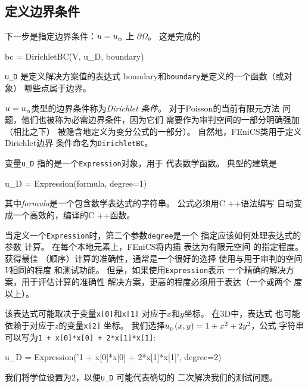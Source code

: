 \subsection{定义边界条件}
下一步是指定边界条件：$u=\ub$ 上
$\partial\Omega$。 这是完成的

\begin{python}
bc = DirichletBC(V, u_D, boundary)
\end{python}

\verb!u_D! 是定义解决方案值的表达式
boundary和\texttt{boundary}是定义的一个函数（或对象）
哪些点属于边界。

$u=\ub$类型的边界条件称为\emph{Dirichlet
条件}。 对于Poisson的当前有限元方法
问题，他们也被称为必需边界条件，因为它们
需要作为审判空间的一部分明确强加（相比之下）
被隐含地定义为变分公式的一部分）。
自然地，FEniCS类用于定义Dirichlet边界
条件命名为\texttt{DirichletBC}。


变量\verb!u_D! 指的是一个\texttt{Expression}对象，用于
代表数学函数。 典型的建筑是

\begin{python}
u_D = Expression(formula, degree=1)
\end{python}

其中\emph{formula}是一个包含数学表达式的字符串。
公式必须用C ++语法编写
自动变成一个高效的，编译的C ++函数。

\begin{notice}[表达和准确性]
当定义一个\texttt{Expression}时，第二个参数\texttt{degree}是一个
指定应该如何处理表达式的参数
计算。 在每个本地元素上，FEniCS将内插
表达为有限元空间
的指定程度。 获得最佳
（顺序）计算的准确性，通常是一个很好的选择
使用与用于审判的空间$ V $相同的程度
和测试功能。 但是，如果使用\texttt{Expression}表示
一个精确的解决方案，用于评估计算的准确性
解决方案，更高的程度必须用于表达（一个或两个
度以上）。
\end{notice}

该表达式可能取决于变量\texttt{x[0]}和\texttt{x[1]}
对应于$x$和$y$坐标。 在3D中，表达式
也可能依赖于对应于$z$的变量\texttt{x[2]}
坐标。 我们选择$\ub(x,y)=1 + x^2 + 2y^2$，公式
字符串可以写为\texttt{1 + x[0]*x[0] + 2*x[1]*x[1]}:

\begin{python}
u_D = Expression('1 + x[0]*x[0] + 2*x[1]*x[1]', degree=2)
\end{python}

我们将学位设置为$2$，以便\verb!u_D! 可能代表确切的
二次解决我们的测试问题。

